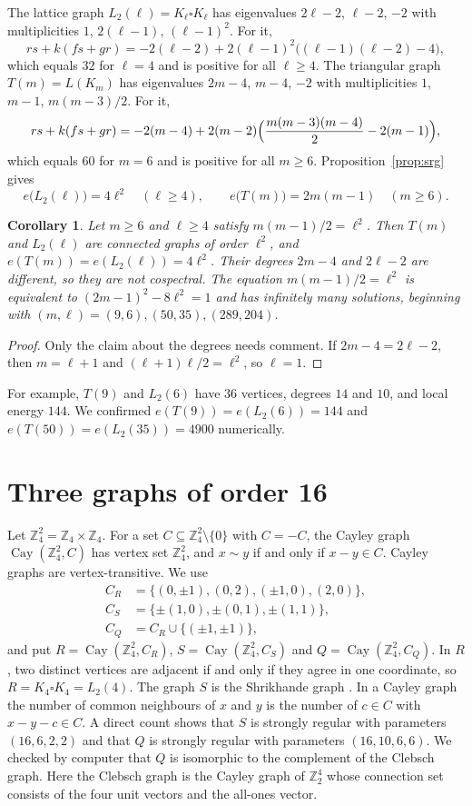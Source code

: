 \documentclass[11pt]{amsart}
\newtheorem{corollary}[theorem]{Corollary}
\theoremstyle{remark}
\DeclareMathOperator{\Cay}{Cay}
\begin{document}
The lattice graph $L_2(\ell)=K_\ell\square K_\ell$ has eigenvalues $2\ell-2$, $\ell-2$, $-2$ with multiplicities $1$, $2(\ell-1)$, $(\ell-1)^2$.
For it,
\[
rs+k(fs+gr)=-2(\ell-2)+2(\ell-1)^2\bigl((\ell-1)(\ell-2)-4\bigr),
\]
which equals $32$ for $\ell=4$ and is positive for all $\ell\ge4$.
The triangular graph $T(m)=L(K_m)$ has eigenvalues $2m-4$, $m-4$, $-2$ with multiplicities $1$, $m-1$, $m(m-3)/2$.
For it,
\[
rs+k(fs+gr)=-2(m-4)+2(m-2)\Bigl(\frac{m(m-3)(m-4)}2-2(m-1)\Bigr),
\]
which equals $60$ for $m=6$ and is positive for all $m\ge6$.
Proposition~\ref{prop:srg} gives
\[
e\bigl(L_2(\ell)\bigr)=4\ell^2\quad(\ell\ge4),\qquad e\bigl(T(m)\bigr)=2m(m-1)\quad(m\ge6).
\]

\begin{corollary}\label{cor:fam}
Let $m\ge6$ and $\ell\ge4$ satisfy $m(m-1)/2=\ell^2$.
Then $T(m)$ and $L_2(\ell)$ are connected graphs of order $\ell^2$, and $e(T(m))=e(L_2(\ell))=4\ell^2$.
Their degrees $2m-4$ and $2\ell-2$ are different, so they are not cospectral.
The equation $m(m-1)/2=\ell^2$ is equivalent to $(2m-1)^2-8\ell^2=1$ and has infinitely many solutions, beginning with $(m,\ell)=(9,6),(50,35),(289,204)$.
\end{corollary}

\begin{proof}
Only the claim about the degrees needs comment.
If $2m-4=2\ell-2$, then $m=\ell+1$ and $(\ell+1)\ell/2=\ell^2$, so $\ell=1$.
\end{proof}

For example, $T(9)$ and $L_2(6)$ have $36$ vertices, degrees $14$ and $10$, and local energy $144$.
We confirmed $e(T(9))=e(L_2(6))=144$ and $e(T(50))=e(L_2(35))=4900$ numerically.

\section{Three graphs of order 16}\label{sec:sixteen}

Let $\mathbb{Z}_4^2=\mathbb{Z}_4\times\mathbb{Z}_4$.
For a set $C\subseteq\mathbb{Z}_4^2\setminus\{0\}$ with $C=-C$, the Cayley graph $\Cay(\mathbb{Z}_4^2,C)$ has vertex set $\mathbb{Z}_4^2$, and $x\sim y$ if and only if $x-y\in C$.
Cayley graphs are vertex-transitive.
We use
\begin{align*}
C_R&=\{(0,\pm1),(0,2),(\pm1,0),(2,0)\},\\
C_S&=\{\pm(1,0),\pm(0,1),\pm(1,1)\},\\
C_Q&=C_R\cup\{(\pm1,\pm1)\},
\end{align*}
and put $R=\Cay(\mathbb{Z}_4^2,C_R)$, $S=\Cay(\mathbb{Z}_4^2,C_S)$ and $Q=\Cay(\mathbb{Z}_4^2,C_Q)$.
In $R$, two distinct vertices are adjacent if and only if they agree in one coordinate, so $R=K_4\square K_4=L_2(4)$.
The graph $S$ is the Shrikhande graph \cite{Shr}.
In a Cayley graph the number of common neighbours of $x$ and $y$ is the number of $c\in C$ with $x-y-c\in C$.
A direct count shows that $S$ is strongly regular with parameters $(16,6,2,2)$ and that $Q$ is strongly regular with parameters $(16,10,6,6)$.
We checked by computer that $Q$ is isomorphic to the complement of the Clebsch graph.
Here the Clebsch graph is the Cayley graph of $\mathbb{Z}_2^4$ whose connection set consists of the four unit vectors and the all-ones vector.
\end{document}
